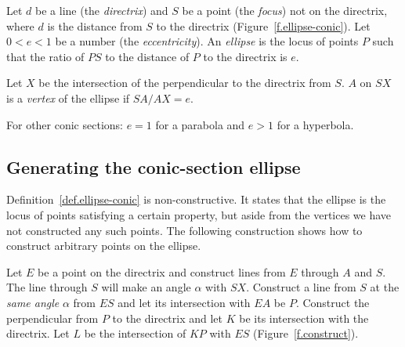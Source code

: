 \begin{definition}\label{def.ellipse-conic}
Let $d$ be a line (the \emph{directrix}) and $S$ be a point (the \emph{focus}) not on the directrix, where $d$ is the distance from $S$ to the directrix (Figure~\ref{f.ellipse-conic}). Let $0<e<1$ be a number (the \emph{eccentricity}). An \emph{ellipse} is the locus of points $P$ such that the ratio of  $PS$ to the distance of $P$ to the directrix is $e$. 

Let $X$ be the intersection of the perpendicular to the directrix from $S$. $A$ on $SX$ is a \emph{vertex} of the ellipse if $SA/AX=e$.

For other conic sections: $e=1$ for a parabola and $e>1$ for a hyperbola.
\end{definition}


\subsection*{Generating the conic-section ellipse}

Definition~\ref{def.ellipse-conic} is non-constructive. It states that the ellipse is the locus of points satisfying a certain property, but aside from the vertices we have not constructed any such points. The following construction shows how to construct arbitrary points on the ellipse.

Let $E$ be a point on the directrix and construct lines from $E$ through $A$ and $S$. The line through $S$ will make an angle $\alpha$ with $SX$. Construct a line from $S$ at the \emph{same angle} $\alpha$ from $ES$ and let its intersection with $EA$ be $P$. Construct the perpendicular from $P$ to the directrix and let $K$ be its intersection with the directrix. Let $L$ be the intersection of $KP$ with $ES$ (Figure~\ref{f.construct}). 


